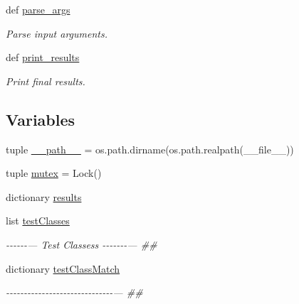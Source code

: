 \begin{DoxyCompactItemize}
def \hyperlink{namespacerapp__testing__tools_1_1rapp__testing__core_ac00a2d9e61a3d94a4f306761dfd6c780}{parse\-\_\-args}
\begin{DoxyCompactList}\small\item\em Parse input arguments. \end{DoxyCompactList}\item 
def \hyperlink{namespacerapp__testing__tools_1_1rapp__testing__core_a0f5a3db1fc6eb0158f511f350f89e646}{print\-\_\-results}
\begin{DoxyCompactList}\small\item\em Print final results. \end{DoxyCompactList}\end{DoxyCompactItemize}
\subsection*{Variables}
\begin{DoxyCompactItemize}
\item 
tuple \hyperlink{namespacerapp__testing__tools_1_1rapp__testing__core_a4329958cf97c12f31374a3d7d70dd39d}{\-\_\-\-\_\-path\-\_\-\-\_\-} = os.\-path.\-dirname(os.\-path.\-realpath(\-\_\-\-\_\-file\-\_\-\-\_\-))
\item 
tuple \hyperlink{namespacerapp__testing__tools_1_1rapp__testing__core_a6aa893ae5a52f7ce64f27bc2f9063bc1}{mutex} = Lock()
\item 
dictionary \hyperlink{namespacerapp__testing__tools_1_1rapp__testing__core_a36485787b1d8c1e042c32a84b18fdc35}{results}
\item 
list \hyperlink{namespacerapp__testing__tools_1_1rapp__testing__core_a53a024ad94a0099489d4e453052170b7}{test\-Classes}
\begin{DoxyCompactList}\small\item\em -\/-\/-\/-\/-\/-\/--- Test Classess -\/-\/-\/-\/-\/-\/-\/--- \#\# \end{DoxyCompactList}\item 
dictionary \hyperlink{namespacerapp__testing__tools_1_1rapp__testing__core_ac313ca7f9bb54dca62d4718d91709bb7}{test\-Class\-Match}
\begin{DoxyCompactList}\small\item\em -\/-\/-\/-\/-\/-\/-\/-\/-\/-\/-\/-\/-\/-\/-\/-\/-\/-\/-\/-\/-\/-\/-\/-\/-\/-\/-\/-\/-\/-\/--- \#\# \end{DoxyCompactList}\end{DoxyCompactItemize}


